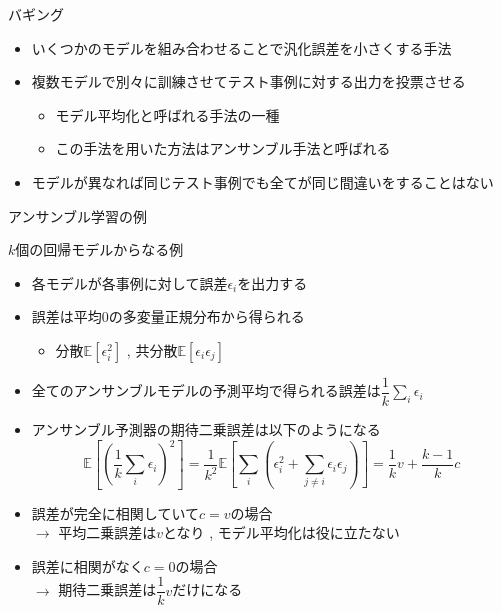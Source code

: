 \documentclass[dvipdfmx, 10pt]{beamer}
\begin{document}
\begin{frame}{バギング}
  \begin{itemize}
    \item いくつかのモデルを組み合わせることで汎化誤差を小さくする手法
    \item 複数モデルで別々に訓練させてテスト事例に対する出力を投票させる
    \begin{itemize}
      \item \alert{モデル平均化}と呼ばれる手法の一種
      \item この手法を用いた方法は\alert{アンサンブル手法}と呼ばれる
    \end{itemize}
    \item モデルが異なれば同じテスト事例でも全てが同じ間違いをすることはない
  \end{itemize}
\end{frame}


\begin{frame}{アンサンブル学習の例}
  \begin{exampleblock}{$k$個の回帰モデルからなる例}
    \begin{itemize}
      \item 各モデルが各事例に対して誤差$\epsilon_{i}$を出力する
      \item 誤差は平均0の多変量正規分布から得られる
      \begin{itemize}
        \item 分散$\mathbb{E}[\epsilon_{i}^{2}]$ , 共分散$\mathbb{E}[\epsilon_{i}\epsilon_{j}]$
      \end{itemize}
      \item 全てのアンサンブルモデルの予測平均で得られる誤差は$\dfrac{1}{k}\sum_{i} \epsilon_{i}$
      \item アンサンブル予測器の期待二乗誤差は以下のようになる
      \begin{equation}
        \mathbb{E}\left[\left(\frac{1}{k} \sum_{i} \epsilon_{i}\right)^{2}\right]=\frac{1}{k^{2}} \mathbb{E}\left[\sum_{i}\left(\epsilon_{i}^{2}+\sum_{j \neq i} \epsilon_{i} \epsilon_{j}\right)\right] = \frac{1}{k} v+\frac{k-1}{k} c 
      \end{equation}
      \item 誤差が完全に相関していて$c = v$の場合\\
      $\rightarrow$ 平均二乗誤差は$v$となり ,  モデル平均化は役に立たない
      \item 誤差に相関がなく$c = 0$の場合\\
      $\rightarrow$ 期待二乗誤差は$\dfrac{1}{k}v$だけになる
    \end{itemize}
  \end{exampleblock}
\end{frame}
\end{document}
